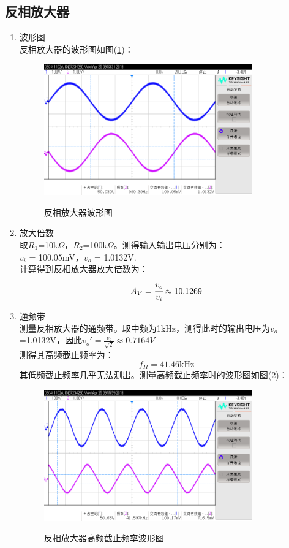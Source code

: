 \documentclass[a4paper]{article}
\begin{document}
\subsection{反相放大器}
\begin{enumerate}
\item 波形图\\
反相放大器的波形图如图(\ref{fig3})：
\begin{figure}[!h]
\centering
\includegraphics[width=9cm]{fig/3cope_6_r.png}\\
\caption{反相放大器波形图}\label{fig3}
\end{figure}
\item 放大倍数\\
取$R_1$=10k$\Omega$，$R_2$=100k$\Omega$。测得输入输出电压分别为：\\
$v_i$ = 100.05mV，$v_o$ = 1.0132V.\\
计算得到反相放大器放大倍数为：
\begin{equation}
A_V = \cfrac{v_o}{v_i} \approx 10.1269
\end{equation}
\item 通频带\\
测量反相放大器的通频带。取中频为1kHz，测得此时的输出电压为$v_o$=1.0132V，因此$v_o' = \frac{v_o}{\sqrt{2}} \approx 0.7164V$\\
测得其高频截止频率为：
$$f_H = 41.46\text{kHz}$$
其低频截止频率几乎无法测出。测量高频截止频率时的波形图如图(\ref{fig4})：
\begin{figure}[!h]
\centering
\includegraphics[width=9cm]{fig/4cope_7_r.png}\\
\caption{反相放大器高频截止频率波形图}\label{fig4}
\end{figure}
\end{enumerate}
\end{document}
